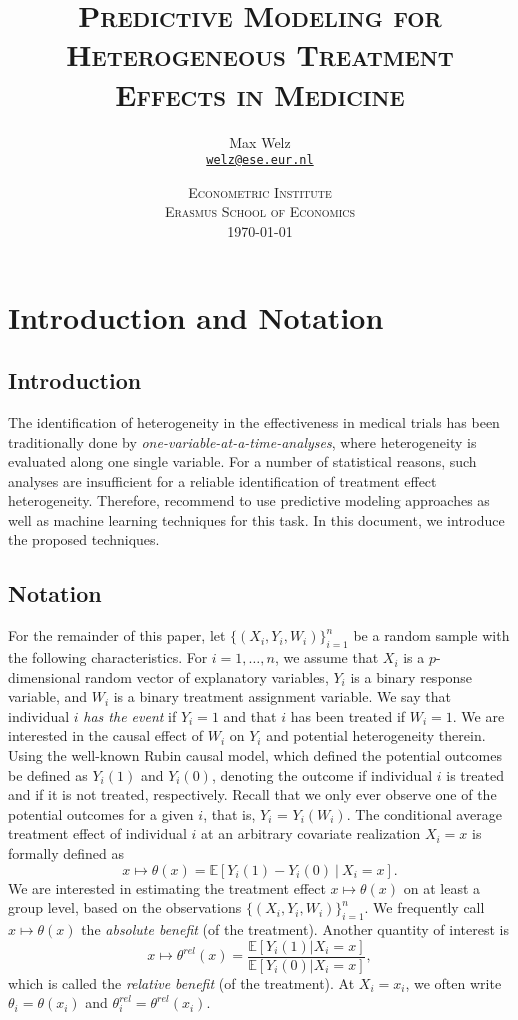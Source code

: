 \documentclass[11pt]{article}
\title{\textsc{Predictive Modeling for Heterogeneous Treatment Effects in Medicine}}
\author{Max Welz \\
  \href{mailto:welz@ese.eur.nl}{\texttt{welz@ese.eur.nl}}}
\date{%
    \textsc{Econometric Institute\\ Erasmus School of Economics}\\[2ex]%
    \today}
\newcommand{\E}{\mathbb{E}}
\begin{document}
\maketitle

\section{Introduction and Notation}

\subsection{Introduction}
The identification of heterogeneity in the effectiveness in medical trials has been traditionally done by \textit{one-variable-at-a-time-analyses}, where heterogeneity is evaluated along one single variable. For a number of statistical reasons, such analyses are insufficient for a reliable identification of treatment effect heterogeneity. Therefore, \cite{kent2020path} recommend to use predictive modeling approaches as well as machine learning techniques for this task. In this document, we introduce the proposed techniques.

\subsection{Notation}
For the remainder of this paper, let $\{(X_i, Y_i,W_i)\}_{i=1}^n$ be a random sample with the following characteristics. For $i = 1,\dots,n$, we assume that $X_i$ is a $p$-dimensional random vector of explanatory variables, $Y_i$ is a binary response variable, and $W_i$ is a binary treatment assignment variable. We say that individual $i$ \textit{has the event} if $Y_i=1$ and that $i$ has been treated if $W_i = 1$. We are interested in the causal effect of $W_i$ on $Y_i$ and potential heterogeneity therein. Using the well-known Rubin causal model, which defined the potential outcomes be defined as $Y_i(1)$ and $Y_i(0)$, denoting the outcome if individual $i$ is treated and if it is not treated, respectively. Recall that we only ever observe one of the potential outcomes for a given $i$, that is, $Y_i$ = $Y_i(W_i)$. The conditional average treatment effect of individual $i$ at an arbitrary covariate realization $X_i = x$ is formally defined as
\begin{equation}\label{eq:absolute-benefit}
    x \mapsto \theta(x) = \E[Y_i(1) - Y_i(0)\ |\ X_i = x].
\end{equation}
We are interested in estimating the treatment effect $x \mapsto \theta(x)$ on at least a group level, based on the observations $\{(X_i, Y_i,W_i)\}_{i=1}^n$. We frequently call $x \mapsto \theta(x)$ the \textit{absolute benefit} (of the treatment). Another quantity of interest is
\begin{equation}\label{eq:relative-benefit}
    x \mapsto \theta^{rel}(x) = \frac{\E[Y_i(1) | X_i = x]}{\E[Y_i(0) | X_i = x]},
\end{equation}
which is called the \textit{relative benefit} (of the treatment). At $X_i = x_i$, we often write $\theta_i = \theta(x_i)$ and $\theta^{rel}_i = \theta^{rel}(x_i)$.
\end{document}
